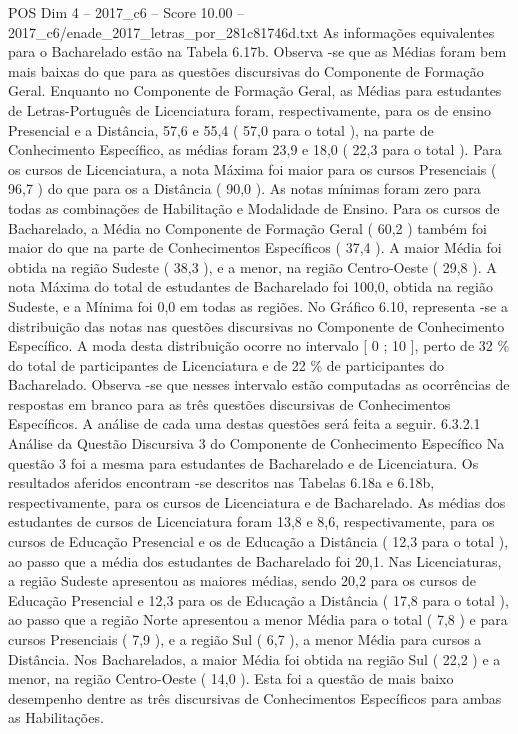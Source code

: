 \begin{textsample}{POS Dim 4 – 2017\_c6 – Score 10.00 – 2017\_c6/enade\_2017\_letras\_por\_281c81746d.txt}
As informações equivalentes para o Bacharelado estão na Tabela 6.17b.
Observa -se que as Médias foram bem mais baixas do que para as questões discursivas do Componente de Formação Geral.
Enquanto no Componente de Formação Geral, as Médias para estudantes de Letras-Português de Licenciatura foram, respectivamente, para os de ensino Presencial e a Distância, 57,6 e 55,4 ( 57,0 para o total ), na parte de Conhecimento Específico, as médias foram 23,9 e 18,0 ( 22,3 para o total ).
Para os cursos de Licenciatura, a nota Máxima foi maior para os cursos Presenciais ( 96,7 ) do que para os a Distância ( 90,0 ).
As notas mínimas foram zero para todas as combinações de Habilitação e Modalidade de Ensino.
Para os cursos de Bacharelado, a Média no Componente de Formação Geral ( 60,2 ) também foi maior do que na parte de Conhecimentos Específicos ( 37,4 ).
A maior Média foi obtida na região Sudeste ( 38,3 ), e a menor, na região Centro-Oeste ( 29,8 ).
A nota Máxima do total de estudantes de Bacharelado foi 100,0, obtida na região Sudeste, e a Mínima foi 0,0 em todas as regiões.
No Gráfico 6.10, representa -se a distribuição das notas nas questões discursivas no Componente de Conhecimento Específico.
A moda desta distribuição ocorre no intervalo [ 0 ; 10 ], perto de 32 \% do total de participantes de Licenciatura e de 22 \% de participantes do Bacharelado.
Observa -se que nesses intervalo estão computadas as ocorrências de respostas em branco para as três questões discursivas de Conhecimentos Específicos.
A análise de cada uma destas questões será feita a seguir. 6.3.2.1 Análise da Questão Discursiva 3 do Componente de Conhecimento Específico Na questão 3 foi a mesma para estudantes de Bacharelado e de Licenciatura.
Os resultados aferidos encontram -se descritos nas Tabelas 6.18a e 6.18b, respectivamente, para os cursos de Licenciatura e de Bacharelado.
As médias dos estudantes de cursos de Licenciatura foram 13,8 e 8,6, respectivamente, para os cursos de Educação Presencial e os de Educação a Distância ( 12,3 para o total ), ao passo que a média dos estudantes de Bacharelado foi 20,1.
Nas Licenciaturas, a região Sudeste apresentou as maiores médias, sendo 20,2 para os cursos de Educação Presencial e 12,3 para os de Educação a Distância ( 17,8 para o total ), ao passo que a região Norte apresentou a menor Média para o total ( 7,8 ) e para cursos Presenciais ( 7,9 ), e a região Sul ( 6,7 ), a menor Média para cursos a Distância.
Nos Bacharelados, a maior Média foi obtida na região Sul ( 22,2 ) e a menor, na região Centro-Oeste ( 14,0 ).
Esta foi a questão de mais baixo desempenho dentre as três discursivas de Conhecimentos Específicos para ambas as Habilitações.

\end{textsample}
